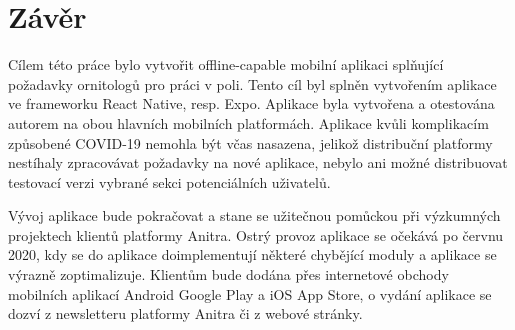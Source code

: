 \chapter*{Závěr}

Cílem této práce bylo vytvořit offline-capable mobilní aplikaci splňující požadavky ornitologů pro práci v poli. Tento cíl byl splněn vytvořením aplikace ve frameworku React Native, resp. Expo. Aplikace byla vytvořena a otestována autorem na obou hlavních mobilních platformách. Aplikace kvůli komplikacím způsobené COVID-19 nemohla být včas nasazena, jelikož distribuční platformy nestíhaly zpracovávat požadavky na nové aplikace, nebylo ani možné distribuovat testovací verzi vybrané sekci potenciálních uživatelů. 

Vývoj aplikace bude pokračovat a stane se užitečnou pomůckou při výzkumných projektech klientů platformy Anitra. Ostrý provoz aplikace se očekává po červnu 2020, kdy se do aplikace doimplementují některé chybějící moduly a aplikace se výrazně zoptimalizuje. Klientům bude dodána přes internetové obchody mobilních aplikací Android Google Play a iOS App Store, o vydání aplikace se dozví z newsletteru platformy Anitra či z webové stránky. 